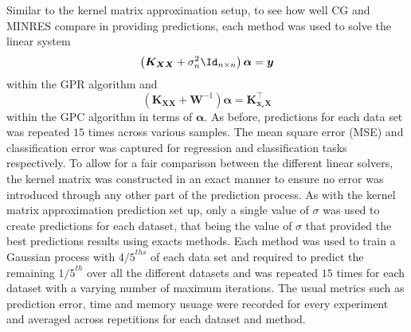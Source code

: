 Similar to the kernel matrix approximation setup, to see how well CG and MINRES compare in providing predictions, each method was used to solve the linear system
\begin{equation*}
    \left( \bm{K_{XX}} + \sigma_n^2 \Id_{n \times n} \right) \bm{\alpha} = \bm{y}
\end{equation*}
within the GPR algorithm and
\begin{equation*}
    \left( \bm{K}_{\bm{X} \bm{X}} + \bm{W}^{-1} \right) \bm{\alpha} = \bm{K}_{\bm{x}_{\star} \bm{X}}^{\intercal}
\end{equation*}
within the GPC algorithm in terms of $\bm{\alpha}$. As before, predictions for each data set was repeated $15$ times across various samples. The mean square error (MSE) and classification error was captured for regression and classification tasks respectively. To allow for a fair comparison between the different linear solvers, the kernel matrix was constructed in an exact manner to ensure no error was introduced through any other part of the prediction process. As with the kernel matrix approximation prediction set up, only a single value of $\sigma$ was used to create predictions for each dataset, that being the value of $\sigma$ that provided the best predictions results using exacts methods. Each method was used to train a Gaussian process with ${4/5}^{ths}$ of each data set and required to predict the remaining ${1/5}^{th}$ over all the different datasets and was repeated $15$ times for each dataset with a varying number of maximum iterations. The usual metrics such as prediction error, time and memory usuage were recorded for every experiment and averaged across repetitions for each dataset and method.